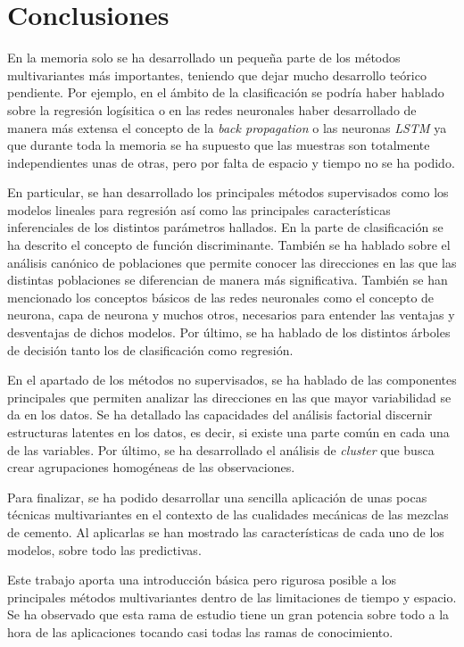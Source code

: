 \chapter{Conclusiones}

En la memoria solo se ha desarrollado un pequeña parte de los métodos multivariantes más importantes, teniendo que dejar mucho desarrollo teórico pendiente. Por ejemplo, en el ámbito de la clasificación se podría haber hablado sobre la regresión logísitica o en las redes neuronales haber desarrollado de manera más extensa el concepto de la \emph{back propagation} o las neuronas \emph{LSTM} ya que durante toda la memoria se ha supuesto que las muestras son totalmente independientes unas de otras, pero por falta de espacio y tiempo no se ha podido.  

\noindent En particular, se han desarrollado los principales métodos supervisados como los modelos lineales para regresión así como las principales características inferenciales de los distintos parámetros hallados. En la parte de clasificación se ha descrito el concepto de función discriminante. También  se ha hablado sobre el análisis canónico de poblaciones que permite conocer las direcciones en las que las distintas poblaciones se diferencian de manera más significativa. También se han mencionado los conceptos básicos de las redes neuronales como el concepto de neurona, capa de neurona y muchos otros, necesarios para entender las ventajas y desventajas de dichos modelos. Por último,  se ha hablado de los distintos árboles de decisión tanto los de clasificación como regresión.

\noindent En el apartado de los métodos no  supervisados, se ha hablado de las componentes principales que permiten analizar las direcciones en las que mayor variabilidad se da en los datos. Se ha detallado las capacidades del análisis factorial discernir estructuras latentes en los datos, es decir, si existe una parte común en cada una de las variables. Por último, se ha desarrollado el análisis de \emph{cluster} que busca crear agrupaciones homogéneas de las observaciones. 

\noindent Para finalizar, se ha podido desarrollar una sencilla aplicación de unas pocas técnicas multivariantes en el contexto de las cualidades mecánicas de las mezclas de cemento. Al aplicarlas se han mostrado las características de cada uno de los modelos, sobre todo las predictivas.  

\noindent Este trabajo aporta una introducción básica  pero rigurosa  posible a los principales métodos multivariantes dentro de las limitaciones  de tiempo y espacio. Se ha observado que esta rama de estudio tiene un gran potencia sobre todo a la hora de las aplicaciones tocando casi todas las ramas de conocimiento. 


